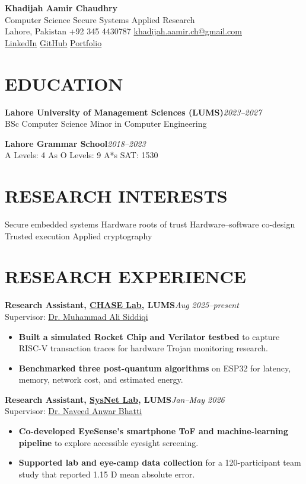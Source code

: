 \documentclass[9pt]{article}
\newcommand{\entry}[3]{\textbf{#1}\hfill {\small\itshape #2}\\[-2pt]{#3}\par}
\begin{document}
\begin{center}
{\LARGE\textbf{Khadijah Aamir Chaudhry}}\\[-1pt]
Computer Science \textperiodcentered{} Secure Systems \textperiodcentered{} Applied Research\\
Lahore, Pakistan \textperiodcentered{} +92 345 4430787 \textperiodcentered{} \href{mailto:khadijah.aamir.ch@gmail.com}{khadijah.aamir.ch@gmail.com}\\[-1pt]
\href{https://www.linkedin.com/in/khadijah-aamir-chaudhry-b88793333/}{LinkedIn} \textperiodcentered{} \href{https://github.com/KAC224}{GitHub} \textperiodcentered{} \href{https://kac224.github.io/}{Portfolio}
\end{center}
\vspace{-9pt}
\section*{EDUCATION}
\entry{Lahore University of Management Sciences (LUMS)}{2023--2027}{BSc Computer Science \textperiodcentered{} Minor in Computer Engineering}
\entry{Lahore Grammar School}{2018--2023}{A Levels: 4 As \textperiodcentered{} O Levels: 9 A*s \textperiodcentered{} SAT: 1530}
\section*{RESEARCH INTERESTS}
Secure embedded systems \textperiodcentered{} Hardware roots of trust \textperiodcentered{} Hardware--software co-design \textperiodcentered{} Trusted execution \textperiodcentered{} Applied cryptography
\section*{RESEARCH EXPERIENCE}
\entry{Research Assistant, \href{https://chase.lums.edu.pk/}{CHASE Lab}, LUMS}{Aug 2025--present}{Supervisor: \href{https://sbasse.lums.edu.pk/lums_employee/9462}{Dr. Muhammad Ali Siddiqi}}
\begin{itemize}
\item \textbf{Built a simulated Rocket Chip and Verilator testbed} to capture RISC-V transaction traces for hardware Trojan monitoring research.
\item \textbf{Benchmarked three post-quantum algorithms} on ESP32 for latency, memory, network cost, and estimated energy.
\end{itemize}
\entry{Research Assistant, \href{https://sysnet.lums.edu.pk/}{SysNet Lab}, LUMS}{Jan--May 2026}{Supervisor: \href{https://sbasse.lums.edu.pk/lums_employee/9361}{Dr. Naveed Anwar Bhatti}}
\begin{itemize}
\item \textbf{Co-developed EyeSense's smartphone ToF and machine-learning pipeline} to explore accessible eyesight screening.
\item \textbf{Supported lab and eye-camp data collection} for a 120-participant team study that reported 1.15 D mean absolute error.
\end{itemize}
\end{document}
